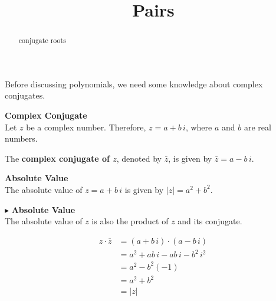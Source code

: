 \documentclass{ximera}
\title{Pairs}
\begin{document}
\begin{abstract}
conjugate roots
\end{abstract}
\maketitle







Before discussing polynomials, we need some knowledge about complex conjugates.




\begin{definition} \textbf{\textcolor{green!50!black}{Complex Conjugate}} \\

Let $z$ be a complex number.  Therefore, $z = a + b \, i$, where $a$ and $b$ are real numbers.



The \textbf{complex conjugate of $z$}, denoted by $\bar{z}$, is given by $\bar{z} = a - b \, i$.



\end{definition}








\begin{definition}   \textbf{\textcolor{green!50!black}{Absolute Value}} \\

The absolute value of $z = a + b \, i$ is given by $|z| = a^2 + b^2$. 


\end{definition}




$\blacktriangleright$ \textbf{Absolute Value}  \\

The absolute value of $z$ is also the product of $z$ and its conjugate.


\begin{explanation}

\begin{align*}
z \cdot \bar{z} &= (a + b \, i) \cdot (a - b \, i) \\
                &= a^2 + ab \, i - ab \, i - b^2 \, i^2 \\
                &= a^2 - b^2 (-1) \\
                &= a^2 + b^2  \\
                &= |z|  
\end{align*}


\end{explanation}
\end{document}
